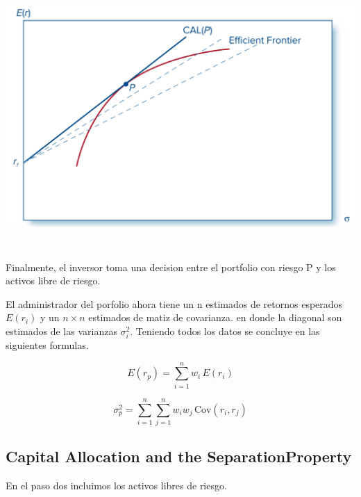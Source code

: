 \documentclass{article}
\begin{document}
\bigskip
\includegraphics[width=15cm, height=10cm]{./img/7_minima_varianza_sharpe.png}

Finalmente, el inversor toma una decision entre el portfolio con riesgo P y los activos libre de riesgo.
\bigskip

El administrador del porfolio ahora tiene un n estimados de retornos esperados $E(r_i)$ y un $n\times  n$ estimados de matiz de covarianza.
en donde la diagonal son estimados de las varianzas $\sigma^2_i$. Teniendo todos los datos se concluye en las siguientes formulas.

\begin{equation}
E(r_p) = \sum_{i=1}^{n} w_i \, E(r_i)
\end{equation}

\begin{equation}
\sigma_p^2 = \sum_{i=1}^{n} \sum_{j=1}^{n} w_i w_j \, \text{Cov}(r_i, r_j)
\end{equation}

\subsection{Capital Allocation and the SeparationProperty}
En el paso dos incluimos los activos libres de riesgo.
\end{document}
